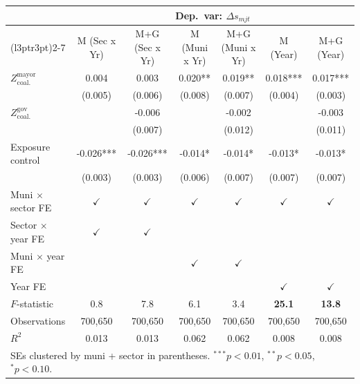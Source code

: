 \begin{tabular}[t]{lcccccc}
\toprule
\multicolumn{1}{c}{\textbf{ }} & \multicolumn{6}{c}{\textbf{Dep.~var: $\Delta s_{mjt}$}} \\
\cmidrule(l{3pt}r{3pt}){2-7}
  & M (Sec x Yr) & M+G (Sec x Yr) & M (Muni x Yr) & M+G (Muni x Yr) & M (Year) & M+G (Year)\\
\midrule
$Z^{\text{mayor}}_{\text{coal.}}$ & 0.004 & 0.003 & 0.020** & 0.019** & 0.018*** & 0.017***\\
 & (0.005) & (0.006) & (0.008) & (0.007) & (0.004) & (0.003)\\
$Z^{\text{gov}}_{\text{coal.}}$ &  & -0.006 &  & -0.002 &  & -0.003\\
 &  & (0.007) &  & (0.012) &  & (0.011)\\
Exposure control & -0.026*** & -0.026*** & -0.014* & -0.014* & -0.013* & -0.013*\\
 & (0.003) & (0.003) & (0.006) & (0.007) & (0.007) & (0.007)\\
\midrule
Muni $\times$ sector FE & $\checkmark$ & $\checkmark$ & $\checkmark$ & $\checkmark$ & $\checkmark$ & $\checkmark$\\
Sector $\times$ year FE & $\checkmark$ & $\checkmark$ &  &  &  & \\
Muni $\times$ year FE &  &  & $\checkmark$ & $\checkmark$ &  & \\
Year FE &  &  &  &  & $\checkmark$ & $\checkmark$\\
$F$-statistic & 0.8 & 7.8 & 6.1 & 3.4 & \textbf{25.1} & \textbf{13.8}\\
Observations & 700,650 & 700,650 & 700,650 & 700,650 & 700,650 & 700,650\\
$R^2$ & 0.013 & 0.013 & 0.062 & 0.062 & 0.008 & 0.008\\
\bottomrule
\multicolumn{7}{l}{\rule{0pt}{1em}SEs clustered by muni + sector in parentheses. $^{***}p<0.01$, $^{**}p<0.05$, $^{*}p<0.10$.}\\
\end{tabular}
